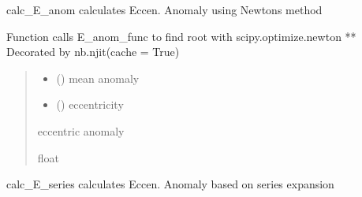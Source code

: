 \documentclass[letterpaper,10pt,english]{sphinxmanual}
\begin{document}
\begin{fulllineitems}
\label{\detokenize{models:pyraa.models.calc_E_anom}}
\pysigstartsignatures
{}
\pysigstopsignatures
\sphinxAtStartPar
calc\_E\_anom \sphinxhyphen{} calculates Eccen. Anomaly using Newton\textquotesingle{}s method

\sphinxAtStartPar
Function calls E\_anom\_func to find root with scipy.optimize.newton
** Decorated by nb.njit(cache = True)
\begin{quote}\begin{description}
\begin{itemize}
\item {} 
\sphinxAtStartPar
{} () \sphinxhyphen{}\sphinxhyphen{} mean anomaly

\item {} 
\sphinxAtStartPar
{} () \sphinxhyphen{}\sphinxhyphen{} eccentricity

\end{itemize}

\sphinxAtStartPar
{} \sphinxhyphen{}\sphinxhyphen{} eccentric anomaly

\sphinxAtStartPar
float

\end{description}\end{quote}

\end{fulllineitems}


\begin{fulllineitems}
\label{\detokenize{models:pyraa.models.calc_E_series}}
\pysigstartsignatures
{}
\pysigstopsignatures
\sphinxAtStartPar
calc\_E\_series \sphinxhyphen{} calculates Eccen. Anomaly based on series expansion

\end{fulllineitems}
\end{document}
